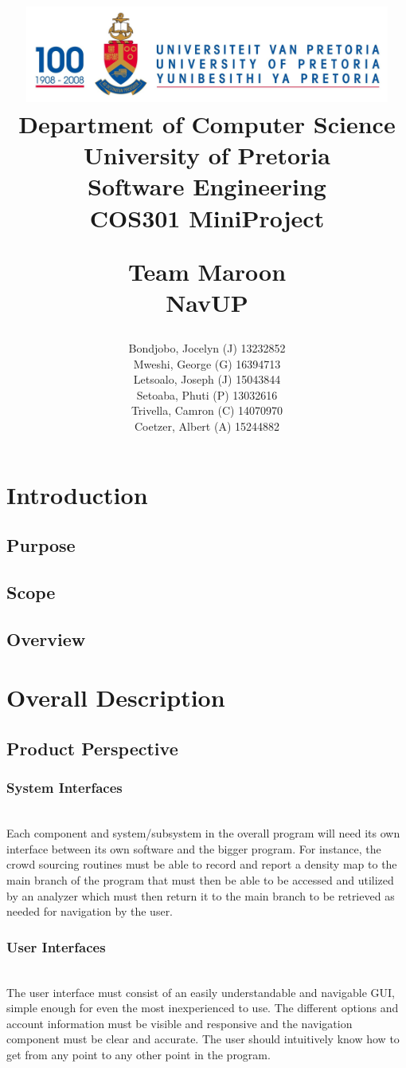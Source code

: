 \documentclass[a4paper,10pt]{article}
\title{\includegraphics[width=12cm]{Eeufeeslogo.jpg} \\
       Department of Computer Science \\
       University of Pretoria \\
       \vspace{0.5cm}
       Software Engineering\\
       COS301 MiniProject \\
       \vspace{0.5cm}
       \begin{large} \textbf{Team Maroon}\\ NavUP\end{large}}
\date{}
\author{Bondjobo, Jocelyn (J) 	13232852 		\\
		Mweshi, George (G)		16394713		\\
		Letsoalo, Joseph (J)	15043844		\\
		Setoaba, Phuti (P)		13032616		\\
		Trivella, Camron (C)	14070970		\\
		Coetzer, Albert (A)		15244882		\\
}
\begin{document}
\maketitle
\thispagestyle{empty}
\clearpage

\newpage
{}
\thispagestyle{empty}
\tableofcontents
\clearpage

\newpage


\section{Introduction}

	\subsection{Purpose} 
	\subsection{Scope} 
	\subsection{Overview} 

\section{Overall Description}

	\subsection{Product Perspective}
	
		\subsubsection{System Interfaces}
			\\ Each component and system/subsystem in the overall program will need its own interface between its own 				software and the bigger program. For instance, the crowd sourcing routines must be able to record and report a 				density map to the main branch of the program that must then be able to be accessed and utilized by an analyzer 			which must then return it to the main branch to be retrieved as needed for navigation by the user.\\
		\subsubsection{User Interfaces}
			\\ The user interface must consist of an easily understandable and navigable GUI, simple enough for even the 				most inexperienced to use. The different options and account information must be visible and responsive and the 			navigation component must be clear and accurate. The user should intuitively know how to get from any point to 				any other point in the program.\\
\end{document}
